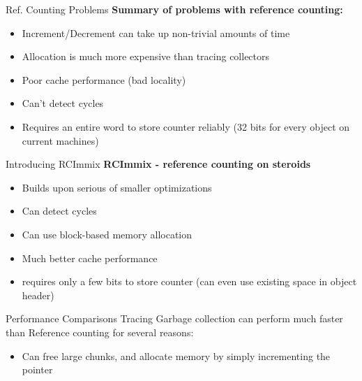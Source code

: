 \documentclass{beamer}
\begin{document}
\begin{frame}{Ref. Counting Problems}
	\textbf{Summary of problems with reference counting:}
	\begin{itemize}
		\item Increment/Decrement can take up non-trivial amounts of time
		\item Allocation is much more expensive than tracing collectors
		\item Poor cache performance (bad locality)
		\item Can't detect cycles
		\item Requires an entire word to store counter reliably (32 bits for every object on current machines)
	\end{itemize}
\end{frame}

\begin{frame}{Introducing RCImmix}
	\textbf{RCImmix - reference counting on steroids}
	\begin{itemize}
		\item Builds upon serious of smaller optimizations
		\item Can detect cycles
		\item Can use block-based memory allocation
		\item Much better cache performance
		\item requires only a few bits to store counter (can even use existing space in object header)
	\end{itemize}
\end{frame}

\begin{frame}{Performance Comparisons}
	Tracing Garbage collection can perform much faster than Reference counting for several reasons:
	\begin{itemize}
		\item Can free large chunks, and allocate memory by simply incrementing the pointer
	\end{itemize}

\end{frame}
\end{document}
